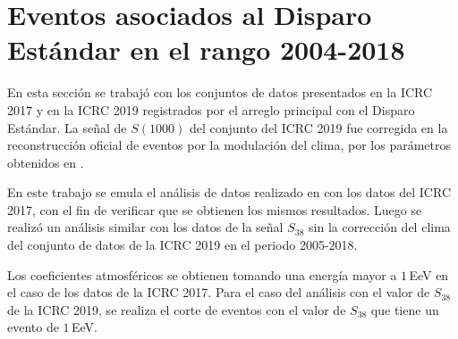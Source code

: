 
\section{Eventos asociados al Disparo Estándar en el rango 2004-2018}\label{Stan_modulacion}	
	
En esta sección se trabajó con los conjuntos de datos  presentados en la ICRC 2017  y  en la ICRC 2019 registrados por el arreglo principal con el Disparo Estándar. La señal de $S(1000)$ del conjunto del ICRC 2019 fue corregida en la reconstrucción oficial de eventos por la modulación del clima, por los parámetros obtenidos en \cite{aab2017impact}. 

En este trabajo se emula el análisis de datos realizado en \cite{aab2017impact} con los datos del ICRC 2017, con el fin de verificar que se obtienen los mismos resultados. Luego se realizó un análisis similar con los datos de la señal $S_{38}$ sin la corrección del clima  del conjunto de datos de la ICRC 2019 en el periodo 2005-2018. 

Los coeficientes atmosféricos se obtienen tomando una energía mayor a $1\,$EeV en el caso de los datos de la ICRC 2017. Para el caso del análisis con el valor de $S_{38}$ de la ICRC 2019, se realiza el corte de eventos con el valor de $S_{38}$  que tiene un evento de $1\,$EeV.  


